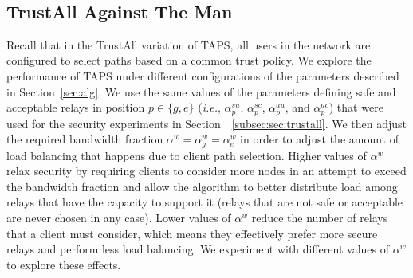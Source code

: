 \documentclass[conference]{styles/IEEEtran}
\renewcommand{\S}{Section~}
\newcommand{\ie}{\emph{i.e.}}
\newcommand{\ps}{TAPS\xspace}
\begin{document}
\begin{figure*}[t]
    \centering
    \\
    \caption{\small Performance of the TrustAll variation of \ps against \textsf{The Man} policy, varying required bandwidth fraction $\alpha^{w}$}
    \label{fig:perf-trust-all}
    \vspace{-4mm}
\end{figure*}



\subsection{TrustAll Against \textsf{The Man}}

Recall that in the TrustAll variation of \ps, all users in the network are
configured to select paths based on a common trust policy.  We explore the performance of \ps under different configurations of the parameters described in \S\ref{sec:alg}. We use the same values of the parameters defining safe and acceptable relays in position $p\in \{g, e\}$ (\ie{}, $\alpha^{su}_{p}$, $\alpha^{sc}_{p}$, $\alpha^{au}_{p}$, and $\alpha^{ac}_{p}$) that were used for
the security experiments in \S~\ref{subsec:sec:trustall}.
We then adjust the required bandwidth fraction $\alpha^w = \alpha^w_g = \alpha^w_e$ in order to
adjust the amount of load balancing that happens due to client path selection. Higher
values of $\alpha^w$ relax security by requiring clients to consider more
nodes in an attempt to exceed the bandwidth fraction and allow the algorithm
to better distribute load among relays that have the capacity to support it
(relays that are not safe or acceptable are never chosen in
any case). Lower values of $\alpha^w$ reduce the number of relays that a
client must consider, which means they effectively prefer more secure relays
and perform less load balancing. We experiment with different
values of $\alpha^w$ to explore these effects.
\end{document}
